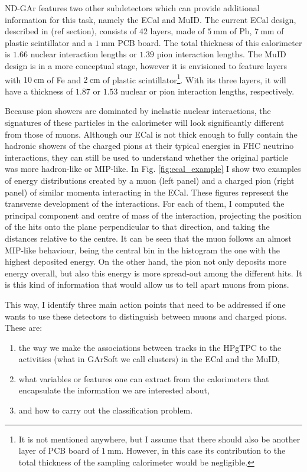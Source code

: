 ND-GAr features two other subdetectors which can provide additional information for this task, namely the ECal and MuID. The current ECal design, described in (ref section), consists of $42$ layers, made of $5~\mathrm{mm}$ of Pb, $7~\mathrm{mm}$ of plastic scintillator and a $1~\mathrm{mm}$ PCB board. The total thickness of this calorimeter is $1.66$ nuclear interaction lengths or $1.39$ pion interaction lengths. The MuID design is in a more conceptual stage, however it is envisioned to feature layers with $10~\mathrm{cm}$ of Fe and $2~\mathrm{cm}$ of plastic scintillator\footnote{It is not mentioned anywhere, but I assume that there should also be another layer of PCB board of $1~\mathrm{mm}$. However, in this case its contribution to the total thickness of the sampling calorimeter would be negligible.}. With its three layers, it will have a thickness of $1.87$ or $1.53$ nuclear or pion interaction lengths, respectively.

Because pion showers are dominated by inelastic nuclear interactions, the signatures of these particles in the calorimeter will look significantly different from those of muons. Although our ECal is not thick enough to fully contain the hadronic showers of the charged pions at their typical energies in FHC neutrino interactions, they can still be used to understand whether the original particle was more hadron-like or MIP-like. In Fig. \ref{fig:ecal_example} I show two examples of energy distributions created by a muon (left panel) and a charged pion (right panel) of similar momenta interacting in the ECal. These figures represent the transverse development of the interactions. For each of them, I computed the principal component and centre of mass of the interaction, projecting the position of the hits onto the plane perpendicular to that direction, and taking the distances relative to the centre. It can be seen that the muon follows an almost MIP-like behaviour, being the central bin in the histogram the one with the highest deposited energy. On the other hand, the pion not only deposits more energy overall, but also this energy is more spread-out among the different hits. It is this kind of information that would allow us to tell apart muons from pions.

This way, I identify three main action points that need to be addressed if one wants to use these detectors to distinguish between muons and charged pions. These are:
\begin{enumerate}
	\item the way we make the associations between tracks in the HPgTPC to the activities (what in GArSoft we call clusters) in the ECal and the MuID,
	\item what variables or features one can extract from the calorimeters that encapsulate the information we are interested about,
	\item and how to carry out the classification problem.
\end{enumerate}


